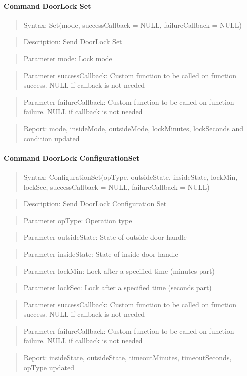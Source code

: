 \paragraph{Command DoorLock Set}
\begin{quote}Syntax: Set(mode, successCallback = NULL, failureCallback = NULL)\end{quote}
\begin{quote}Description: Send DoorLock Set\end{quote}
\begin{quote}Parameter mode: Lock mode\end{quote}
\begin{quote}Parameter successCallback: Custom function to be called on function success. NULL if callback is not needed\end{quote}
\begin{quote}Parameter failureCallback: Custom function to be called on function failure. NULL if callback is not needed\end{quote}
\begin{quote}Report: mode, insideMode, outsideMode, lockMinutes, lockSeconds and condition updated\end{quote}

\paragraph{Command DoorLock ConfigurationSet}
\begin{quote}Syntax: ConfigurationSet(opType, outsideState, insideState, lockMin, lockSec, successCallback = NULL, failureCallback = NULL)\end{quote}
\begin{quote}Description: Send DoorLock Configuration Set\end{quote}
\begin{quote}Parameter opType: Operation type\end{quote}
\begin{quote}Parameter outsideState: State of outside door handle\end{quote}
\begin{quote}Parameter insideState: State of inside door handle\end{quote}
\begin{quote}Parameter lockMin: Lock after a specified time (minutes part)\end{quote}
\begin{quote}Parameter lockSec: Lock after a specified time (seconds part)\end{quote}
\begin{quote}Parameter successCallback: Custom function to be called on function success. NULL if callback is not needed\end{quote}
\begin{quote}Parameter failureCallback: Custom function to be called on function failure. NULL if callback is not needed\end{quote}
\begin{quote}Report: insideState, outsideState, timeoutMinutes, timeoutSeconds, opType updated\end{quote}


